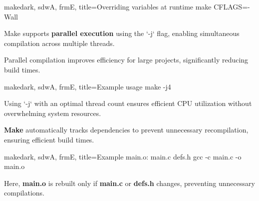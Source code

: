 \begin{NxCodeBox}{make}{dark, sdwA, frmE, title={Overriding variables at runtime}}
	make CFLAGS=-Wall
\end{NxCodeBox}

\begin{NxSSSSBox}
	\begin{NxIDBox}
		Make supports \textbf{parallel execution} using the `-j` flag, enabling simultaneous compilation across multiple threads.
	\end{NxIDBox}
	\begin{NxIDBox}
		Parallel compilation improves efficiency for large projects, significantly reducing build times.
	\end{NxIDBox}
\end{NxSSSSBox}

\begin{NxCodeBox}{make}{dark, sdwA, frmE, title={Example usage}}
	make -j4
\end{NxCodeBox}

\bigskip

\begin{NxSSSSBox}[breakable]
	\begin{NxIDBox}
		Using `-j` with an optimal thread count ensures efficient CPU utilization without overwhelming system resources.
	\end{NxIDBox}
\end{NxSSSSBox}


\begin{NxSSSSBox}
	\begin{NxIDBox}
		\textbf{Make} automatically tracks dependencies to prevent unnecessary recompilation, ensuring efficient build times.
	\end{NxIDBox}
\end{NxSSSSBox}

\begin{NxCodeBox}{make}{dark, sdwA, frmE, title={Example}}
	main.o: main.c defs.h
		gcc -c main.c -o main.o
\end{NxCodeBox}

\bigskip

\begin{NxSSSSBox}[breakable]
	\begin{NxIDBox}
		Here, \textbf{main.o} is rebuilt only if \textbf{main.c} or \textbf{defs.h} changes, preventing unnecessary compilations.
	\end{NxIDBox}
\end{NxSSSSBox}

